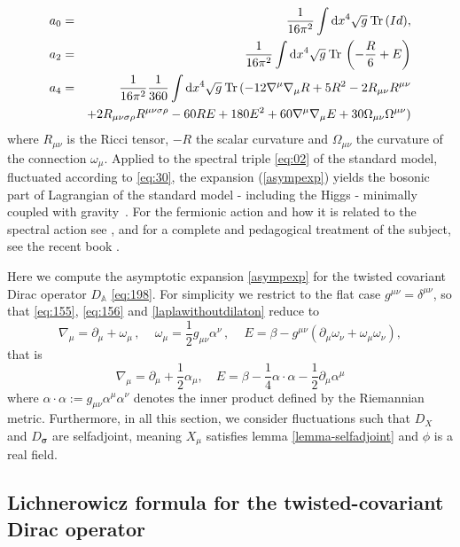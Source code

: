 \documentclass[11pt]{article}
\newcommand{\sig}{{\boldsymbol{\sigma}}}
\newcommand{\Tr}[1]{\:{\rm Tr}\,#1}
\newcommand{\del}{\partial}
\newcommand{\dd}{{\mathrm d}}
\begin{document}
\begin{eqnarray}
a_0&=&\frac 1{16\pi^2}\int\dd x^4 \sqrt{g}
\Tr(Id), \hfill\\ 
a_2&=&\frac 1{16\pi^2}\int\dd x^4 \sqrt{g}
\Tr\left(-\frac R6+E\right)\nonumber \hfill\\
a_4&=&\frac{1}{16\pi^2}\frac{1}{360}\int\dd x^4 \sqrt{g} \Tr(-12\nabla^\mu\nabla_\mu R +5R^2-2R_{\mu\nu}R^{\mu\nu}\\
& &+2R_{\mu\nu\sigma\rho}R^{\mu\nu\sigma\rho}-60RE+180E^2+60\nabla^\mu\nabla_\mu
E+30\Omega_{\mu\nu}\Omega^{\mu\nu}) \label{spectralcoeff}
\end{eqnarray}
where $R_{\mu\nu}$ is the Ricci tensor, $-R$ the scalar curvature and
$\Omega_{\mu\nu}$ the curvature of the connection $\omega_\mu$.
Applied to the spectral triple \eqref{eq:02} of the standard model,
fluctuated according to \eqref{eq:30}, the expansion
(\ref{asympexp}) yields the bosonic part of 
Lagrangian of the standard model - including the Higgs - minimally coupled with
gravity~\cite[Sect.~4.1]{Chamseddine:2007oz}. For the fermionic action
and how it is related to the spectral action see \cite{Adrianov:2011fk}, \cite{Lizzi:2010vn} and for a complete and pedagogical treatment of
the subject, see the recent book \cite{Walterlivre}. 

Here we compute the asymptotic expansion \eqref{asympexp} for the twisted covariant Dirac operator $D_{\mathbb
  A}$ \eqref{eq:198}.
For simplicity we restrict to the flat
case $g^{\mu\nu}=\delta^{\mu\nu}$, so that \eqref{eq:155}, \eqref{eq:156} and \eqref{laplawithoutdilaton} reduce to
\begin{equation}
  \label{eq:-38}
\nabla_{\mu}=\partial_{\mu}+\omega_{\mu}\,,\,\quad\omega_{\mu}=\frac{1}{2}g_{\mu\nu}\alpha^{\nu}\,,\,\quad
E=\beta-g^{\mu\nu}\left(\partial_{\mu}\omega_{\nu}+\omega_{\mu}\omega_{\nu}\right),
\end{equation}
that is
\begin{equation}
  \label{eq:38}
 \nabla_\mu = \del_\mu + \frac 12 \alpha_\mu, \quad  E = \beta - \frac 14 \alpha \cdot \alpha - \frac 12
\del_\mu \alpha^\mu
\end{equation}
where $\alpha\cdot\alpha := g_{\mu\nu}\alpha^\mu \alpha^\nu$ denotes
the inner product defined by the Riemannian metric. Furthermore, in all this section, we consider fluctuations such that $D_X$
and $D_\sig$ are selfadjoint, meaning $X_\mu$ satisfies lemma
\ref{lemma-selfadjoint} and $\phi$ is a real field.


\subsection{Lichnerowicz formula for the twisted-covariant Dirac operator}
\label{section:squaretwisteddirac}
\end{document}
